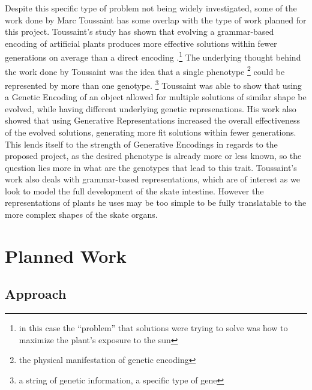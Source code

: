 \documentclass[condensed]{union-cs-thesis}
\begin{document}
\par
Despite this specific type of problem not being widely investigated, some of the work done by Marc
Toussaint has some overlap with the type of work planned for this project.
Toussaint's study has shown that evolving a grammar-based encoding of artificial plants produces more
effective solutions within fewer generations on average than a direct encoding
\cite{toussaint2003demonstrating}.\footnote{in this case the ``problem'' that solutions were trying to
  solve was how to maximize the plant's exposure to the sun}
The underlying thought behind the work done by Toussaint was the idea that a single phenotype
\footnote{the physical manifestation of genetic encoding}
could be represented by more than one genotype.
\footnote{a string of genetic information, a specific type of gene}
Toussaint was able to show that using a Genetic Encoding of an object allowed for multiple solutions
of similar shape be evolved, while having different underlying genetic represenations.  His work also
showed that using Generative Representations increased the overall effectiveness of the evolved
solutions, generating more fit solutions within fewer generations.  This lends itself to the strength
of Generative Encodings in regards to the proposed project, as the desired phenotype is already more
or less known, so the question lies more in what are the genotypes that lead to this trait.  Toussaint's
work also deals with grammar-based representations, which are of interest as we look to model the full
development of the skate intestine.  However the representations of plants he uses may be too simple
to be fully translatable to the more complex shapes of the skate organs.

\section{Planned Work}

\subsection{Approach}
\end{document}
